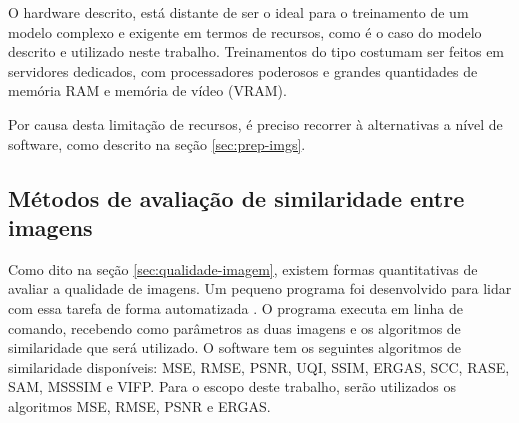 O hardware descrito, está distante de ser o ideal para o treinamento de um modelo complexo e exigente em termos de recursos, como é o caso do modelo descrito e utilizado neste trabalho. Treinamentos do tipo costumam ser feitos em servidores dedicados, com processadores poderosos e grandes quantidades de memória RAM e memória de vídeo (VRAM).

Por causa desta limitação de recursos, é preciso recorrer à alternativas a nível de software, como descrito na seção \ref{sec:prep-imgs}.

\subsection{Métodos de avaliação de similaridade entre imagens}
\label{aval-similarity-images}

Como dito na seção \ref{sec:qualidade-imagem}, existem formas quantitativas de avaliar a qualidade de imagens. Um pequeno programa foi desenvolvido para lidar com essa tarefa de forma automatizada \cite{vasconcelos_leonamtvimage-similarity-scripts_2023}. O programa executa em linha de comando, recebendo como parâmetros as duas imagens e os algoritmos de similaridade que será utilizado. O software tem os seguintes algoritmos de similaridade disponíveis: MSE, RMSE, PSNR, UQI, SSIM, ERGAS, SCC, RASE, SAM, MSSSIM e VIFP. Para o escopo deste trabalho, serão utilizados os algoritmos MSE, RMSE, PSNR e ERGAS.
